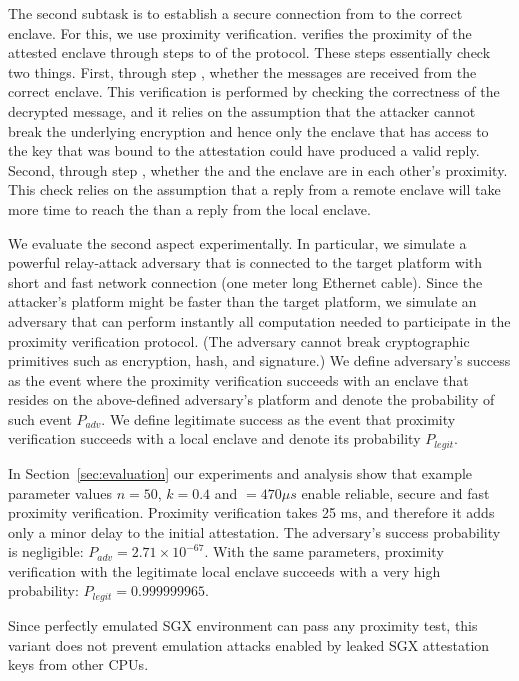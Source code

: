 The second subtask is to establish a secure connection from \device to the correct enclave. For this, we use proximity verification. \device verifies the proximity of the attested enclave through steps \five to \eight of the protocol. These steps essentially check two things. First, through step \seven, whether the messages are received from the correct enclave. This verification is performed by checking the correctness of the decrypted message, and it relies on the assumption that the attacker cannot break the underlying encryption and hence only the enclave that has access to the key that was bound to the attestation could have produced a valid reply. Second, through step \eight, whether the \device and the enclave are in each other's proximity. This check relies on the assumption that a reply from a remote enclave will take more time to reach the \device than a reply from the local enclave.

We evaluate the second aspect experimentally. In particular, we simulate a powerful relay-attack adversary that is connected to the target platform with short and fast network connection (one meter long Ethernet cable). Since the attacker's platform might be faster than the target platform, we simulate an adversary that can perform instantly all computation needed to participate in the proximity verification protocol. (The adversary cannot break cryptographic primitives such as encryption, hash, and signature.) We define adversary's success as the event where the proximity verification succeeds with an enclave that resides on the above-defined adversary's platform and denote the probability of such event $P_{adv}$. We define legitimate success as the event that proximity verification succeeds with a local enclave and denote its probability $P_{legit}$.

In Section~\ref{sec:evaluation} our experiments and analysis show that example parameter values $n=50$, $k=0.4$ and \connect$=470 \mu s$ enable reliable, secure and fast proximity verification. Proximity verification takes 25 ms, and therefore it adds only a minor delay to the initial attestation. The adversary's success probability is negligible: $P_{adv}=2.71\times 10^{-67}$. With the same parameters, proximity verification with the legitimate local enclave succeeds with a very high probability: $P_{legit}=0.999999965$. 

Since perfectly emulated SGX environment can pass any proximity test, this variant does not prevent emulation attacks enabled by leaked SGX attestation keys from other CPUs.

